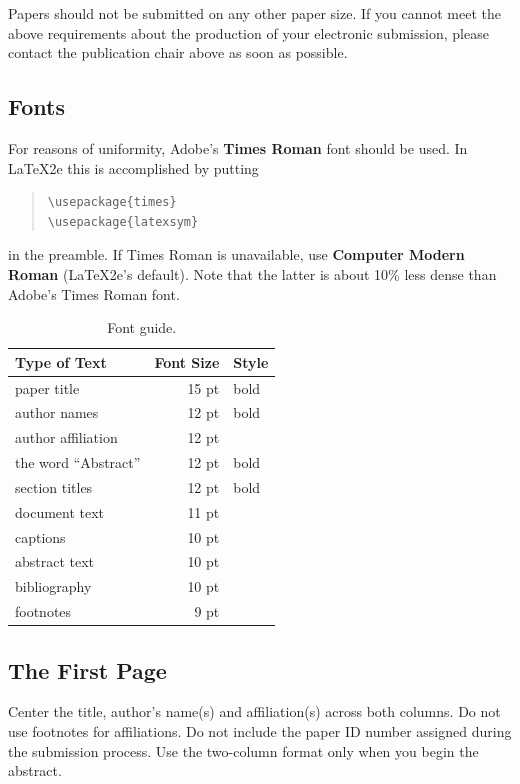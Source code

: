 \documentclass[11pt,letterpaper]{article}
\begin{document}
\noindent Papers should not be submitted on any other paper size. If you cannot meet the above requirements about the production of your electronic submission, please contact the publication chair above as soon as possible.

\subsection{Fonts}

For reasons of uniformity, Adobe's {\bf Times Roman} font should be
used. In \LaTeX2e{} this is accomplished by putting

\begin{quote}
\begin{verbatim}
\usepackage{times}
\usepackage{latexsym}
\end{verbatim}
\end{quote}
in the preamble. If Times Roman is unavailable, use {\bf Computer
  Modern Roman} (\LaTeX2e{}'s default).  Note that the latter is about
  10\% less dense than Adobe's Times Roman font.


\begin{table}[h]
\begin{center}
\begin{tabular}{|l|rl|}
\hline \bf Type of Text & \bf Font Size & \bf Style \\ \hline
paper title & 15 pt & bold \\
author names & 12 pt & bold \\
author affiliation & 12 pt & \\
the word ``Abstract'' & 12 pt & bold \\
section titles & 12 pt & bold \\
document text & 11 pt  &\\
captions & 10 pt & \\
abstract text & 10 pt & \\
bibliography & 10 pt & \\
footnotes & 9 pt & \\
\hline
\end{tabular}
\end{center}
\caption{\label{font-table} Font guide. }
\end{table}

\subsection{The First Page}
\label{ssec:first}

Center the title, author's name(s) and affiliation(s) across both
columns. Do not use footnotes for affiliations.  Do not include the
paper ID number assigned during the submission process.
Use the two-column format only when you begin the abstract.
\end{document}
